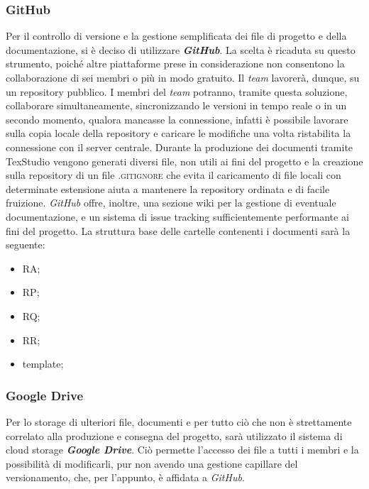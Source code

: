 		\subsubsection{GitHub}
		Per il controllo di versione e la gestione semplificata dei file di progetto e della documentazione, si è deciso di utilizzare \textbf{\textit{GitHub}}. La scelta è ricaduta su questo strumento, poiché altre piattaforme prese in considerazione non consentono la collaborazione di sei membri o più in modo gratuito. Il \textit{team} lavorerà, dunque, su un repository pubblico. I membri del \textit{team} potranno, tramite questa soluzione, collaborare simultaneamente, sincronizzando le versioni in tempo reale o in un secondo momento, qualora mancasse la connessione, infatti è possibile lavorare sulla copia locale della repository e caricare le modifiche una volta ristabilita la connessione con il server centrale. Durante la produzione dei documenti tramite TexStudio vengono generati diversi file, non utili ai fini del progetto e la creazione sulla repository di un file \textsc{.gitignore} che evita il caricamento di file locali con determinate estensione aiuta a mantenere la repository ordinata e di facile fruizione. \textit{GitHub} offre, inoltre, una sezione wiki per la gestione di eventuale documentazione, e un sistema di issue tracking sufficientemente performante ai fini del progetto. 
		La struttura base delle cartelle contenenti i documenti sarà la seguente:
		\begin{itemize}
			\item RA;
			\item RP;
			\item RQ;
			\item RR;
			\item template;
		\end{itemize}

		\subsubsection{Google Drive}
		Per lo storage di ulteriori file, documenti e per tutto ciò che non è strettamente correlato alla produzione e consegna del progetto, sarà utilizzato il sistema di cloud storage \textbf{\textit{Google Drive}}. Ciò permette l'accesso dei file a tutti i membri e la possibilità di modificarli, pur non avendo una gestione capillare del versionamento, che, per l'appunto, è affidata a \textit{GitHub}.

